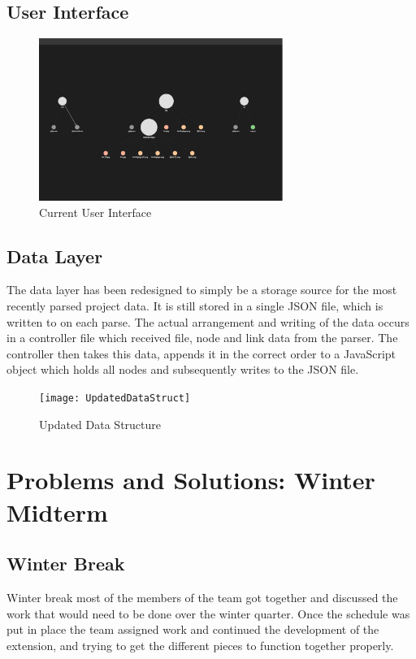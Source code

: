 \documentclass[letterpaper,10pt,titlepage,draftclsnofoot,onecolumn,onesided] {IEEEtran}
\begin{document}
	\subsection{User Interface}

	\begin{figure}
		\includegraphics[width=300px]{capstoneUI1}
		\caption{Current User Interface}
	\end{figure}

	\subsection{Data Layer}
	The data layer has been redesigned to simply be a storage source for the most recently parsed project data.
	It is still stored in a single JSON file, which is written to on each parse.
	The actual arrangement and writing of the data occurs in a controller file which received file, node and link data from the parser.
	The controller then takes this data, appends it in the correct order to a JavaScript object which holds all nodes and subsequently writes to the JSON file.
	\begin{figure}
		\texttt{[image: UpdatedDataStruct]}
		\caption{Updated Data Structure}
	\end{figure}

\section{Problems and Solutions: Winter Midterm }
	\subsection{Winter Break}
	Winter break most of the members of the team got together and discussed the work that would need to be done over the winter quarter.
	Once the schedule was put in place the team assigned work and continued the development of the extension, and trying to get the different pieces to function together properly. 
	
\end{document}
